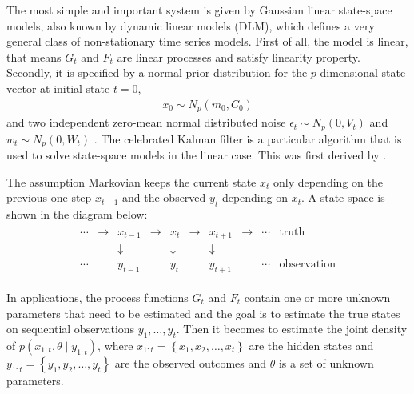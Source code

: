The most simple and important system is given by Gaussian linear state-space models, also known by dynamic linear models (DLM), which defines a very general class of non-stationary time series models. First of all, the model is linear, that means $G_t$ and $F_t$ are linear processes and satisfy linearity property. Secondly, it is specified by a normal prior distribution for the $p$-dimensional state vector at initial state $t=0$, 
\begin{align*}
x_0 \sim N_p(m_0,C_0)
\end{align*} 
and two independent zero-mean normal distributed noise $\epsilon_t \sim N_p(0,V_t)$ and $w_t \sim N_p(0,W_t)$ \citep{petris2009dynamic}. The celebrated Kalman filter is a particular algorithm that is used to solve state-space models in the linear case. This was first derived by \cite{kalman1960new}.

The assumption Markovian keeps the current state $x_t$ only depending on the previous one step $x_{t-1}$ and the observed $y_t$ depending on $x_t$. A state-space is shown in the diagram below:
\begin{align*}
\begin{array}{cccccccccc}\cdots &\to &x_{t-1}&\to &x_{t}&\to &x_{t+1}&\to &\cdots &{\text{truth}}\\  &&\downarrow &&\downarrow &&\downarrow && &\\ \cdots&&y_{t-1}&&y_{t}&&y_{t+1}&&\cdots &{\text{observation}}\end{array}
\end{align*}

In applications, the process functions $G_t$ and $F_t$ contain one or more unknown parameters that need to be estimated \citep{de1988likelihood} and the goal is to estimate the true states on sequential observations $y_1, \ldots, y_t$. Then it becomes to estimate the joint density of $p(x_{1:t},\theta \mid y_{1:t})$, where $x_{1:t} = \left\lbrace x_1, x_2, \ldots, x_t \right\rbrace$ are the hidden states and $y_{1:t} = \left\lbrace y_1, y_2, \ldots, y_t \right\rbrace$ are the observed outcomes and $\theta$ is a set of unknown parameters. 


